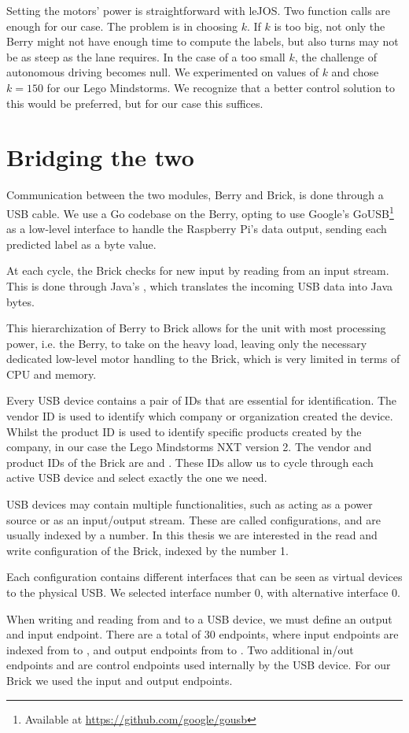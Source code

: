 Setting the motors' power is straightforward with leJOS. Two function calls are enough for our
case. The problem is in choosing $k$. If $k$ is too big, not only the Berry might not have enough
time to compute the labels, but also turns may not be as steep as the lane requires. In the case of
a too small $k$, the challenge of autonomous driving becomes null. We experimented on values of $k$
and chose $k=150$ for our Lego Mindstorms. We recognize that a better control solution to this
would be preferred, but for our case this suffices.

\section{Bridging the two}

Communication between the two modules, Berry and Brick, is done through a USB cable. We use a Go
codebase on the Berry, opting to use Google's GoUSB\footnote{Available at
\url{https://github.com/google/gousb}} as a low-level interface to handle the Raspberry Pi's data
output, sending each predicted label as a byte value.

At each cycle, the Brick checks for new input by reading from an input stream. This is done through
Java's , which translates the incoming USB data into Java bytes.

This hierarchization of Berry to Brick allows for the unit with most processing power, i.e.  the
Berry, to take on the heavy load, leaving only the necessary dedicated low-level motor handling to
the Brick, which is very limited in terms of CPU and memory.

Every USB device contains a pair of IDs that are essential for identification. The vendor ID is
used to identify which company or organization created the device. Whilst the product ID is used to
identify specific products created by the company, in our case the Lego Mindstorms NXT version 2.
The vendor and product IDs of the Brick are  and . These IDs allow us to
cycle through each active USB device and select exactly the one we need.

USB devices may contain multiple functionalities, such as acting as a power source or as an
input/output stream. These are called configurations, and are usually indexed by a number. In this
thesis we are interested in the read and write configuration of the Brick, indexed by the number 1.

Each configuration contains different interfaces that can be seen as virtual devices to the
physical USB. We selected interface number 0, with alternative interface 0.

When writing and reading from and to a USB device, we must define an output and input endpoint.
There are a total of 30 endpoints, where input endpoints are indexed from  to
, and output endpoints from  to . Two additional in/out endpoints
 and  are control endpoints used internally by the USB device. For our Brick
we used the input  and output  endpoints.

